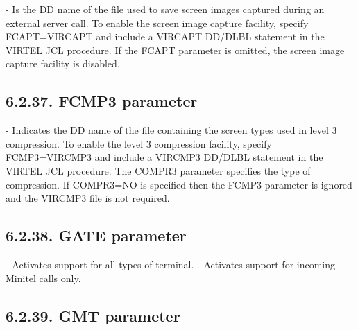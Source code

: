 \documentclass[letterpaper,10pt,english]{sphinxmanual}
\begin{document}
 - Is the DD name of the file used to save screen images captured during an external server call. To enable the screen image capture facility, specify FCAPT=VIRCAPT and include a VIRCAPT DD/DLBL statement in the VIRTEL JCL procedure. If the FCAPT parameter is omitted, the screen image capture facility is disabled.


\subsection{6.2.37. FCMP3 parameter}
\label{\detokenize{Installation_Guide:fcmp3-parameter}}
\begin{sphinxVerbatim}[commandchars=\\\{\}]
 
\end{sphinxVerbatim}

 - Indicates the DD name of the file containing the screen types used in level 3 compression. To enable the level 3 compression facility, specify FCMP3=VIRCMP3 and include a VIRCMP3 DD/DLBL statement in the VIRTEL JCL procedure. The COMPR3 parameter specifies the type of compression. If COMPR3=NO is specified then the FCMP3 parameter is ignored and the VIRCMP3 file is not required.


\subsection{6.2.38. GATE parameter}
\label{\detokenize{Installation_Guide:gate-parameter}}
\begin{sphinxVerbatim}[commandchars=\\\{\}]
 
\end{sphinxVerbatim}

 - Activates support for all types of terminal.
 - Activates support for incoming Minitel calls only.


\subsection{6.2.39. GMT parameter}
\label{\detokenize{Installation_Guide:gmt-parameter}}
\begin{sphinxVerbatim}[commandchars=\\\{\}]
 
\end{sphinxVerbatim}
\end{document}
